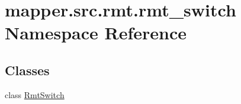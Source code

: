 \hypertarget{namespacemapper_1_1src_1_1rmt_1_1rmt__switch}{}\section{mapper.\+src.\+rmt.\+rmt\+\_\+switch Namespace Reference}
\label{namespacemapper_1_1src_1_1rmt_1_1rmt__switch}
\subsection*{Classes}
\begin{DoxyCompactItemize}
\item 
class \hyperlink{classmapper_1_1src_1_1rmt_1_1rmt__switch_1_1_rmt_switch}{Rmt\+Switch}
\end{DoxyCompactItemize}
